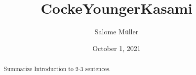 \documentclass[10pt]{article}
\title{CockeYoungerKasami}
\author{Salome Müller}
\date{October 1, 2021}
\newcommand{\todo}[1]{{\color{red}#1}}
\begin{document}
\maketitle

\begin{abstract}
    \todo{Summarize Introduction to 2-3 sentences.}
\end{abstract}

\pagebreak
\tableofcontents
\pagebreak







\end{document}
